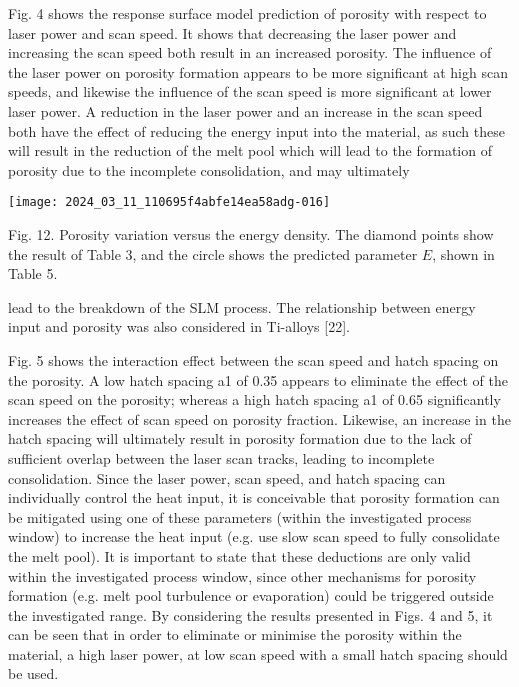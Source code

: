 \documentclass[10pt]{article}
\begin{document}
Fig. 4 shows the response surface model prediction of porosity with respect to laser power and scan speed. It shows that decreasing the laser power and increasing the scan speed both result in an increased porosity. The influence of the laser power on porosity formation appears to be more significant at high scan speeds, and likewise the influence of the scan speed is more significant at lower laser power. A reduction in the laser power and an increase in the scan speed both have the effect of reducing the energy input into the material, as such these will result in the reduction of the melt pool which will lead to the formation of porosity due to the incomplete consolidation, and may ultimately

\begin{center}
\texttt{[image: 2024\_03\_11\_110695f4abfe14ea58adg-016]}
\end{center}

Fig. 12. Porosity variation versus the energy density. The diamond points show the result of Table 3, and the circle shows the predicted parameter $E$, shown in Table 5.

lead to the breakdown of the SLM process. The relationship between energy input and porosity was also considered in Ti-alloys [22].

Fig. 5 shows the interaction effect between the scan speed and hatch spacing on the porosity. A low hatch spacing a1 of 0.35 appears to eliminate the effect of the scan speed on the porosity; whereas a high hatch spacing a1 of 0.65 significantly increases the effect of scan speed on porosity fraction. Likewise, an increase in the hatch spacing will ultimately result in porosity formation due to the lack of sufficient overlap between the laser scan tracks, leading to incomplete consolidation. Since the laser power, scan speed, and hatch spacing can individually control the heat input, it is conceivable that porosity formation can be mitigated using one of these parameters (within the investigated process window) to increase the heat input (e.g. use slow scan speed to fully consolidate the melt pool). It is important to state that these deductions are only valid within the investigated process window, since other mechanisms for porosity formation (e.g. melt pool turbulence or evaporation) could be triggered outside the investigated range. By considering the results presented in Figs. 4 and 5, it can be seen that in order to eliminate or minimise the porosity within the material, a high laser power, at low scan speed with a small hatch spacing should be used.
\end{document}
